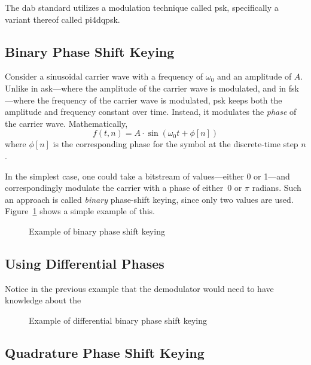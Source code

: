 \documentclass[class=report,11pt,crop=false]{standalone}
\begin{document}
The \gls{dab} standard utilizes a modulation technique called \acrlong{psk}, specifically a variant thereof called \gls{pi4dqpsk}.

\subsection{Binary Phase Shift Keying}
Consider a sinusoidal carrier wave with a frequency of \(\omega_0\) and an amplitude of \(A\). Unlike in \gls{ask}---where the amplitude of the carrier wave is modulated, and in \gls{fsk}---where the frequency of the carrier wave is modulated, \gls{psk} keeps both the amplitude and frequency constant over time. Instead, it modulates the \emph{phase} of the carrier wave. Mathematically,
\begin{equation}
    f(t, n) = A \cdot \sin(\omega_0t + \phi[n])
\end{equation}
where \(\phi[n]\) is the corresponding phase for the symbol at the discrete-time step \(n\).

In the simplest case, one could take a bitstream of values---either 0 or 1---and correspondingly modulate the carrier with a phase of either~\(0\) or \(\pi\) radians. Such an approach is called \emph{binary} phase-shift keying, since only two values are used. Figure~\ref{fig:binary-psk} shows a simple example of this.

\begin{figure}[htbp]
    \centering
    \def\svgwidth{1\linewidth}
    { %
        }
    \caption{Example of binary phase shift keying}
    \label{fig:binary-psk}
\end{figure}

\subsection{Using Differential Phases}
Notice in the previous example that the demodulator would need to have knowledge about the

\begin{figure}[htbp]
    \centering
    \def\svgwidth{1\linewidth}
    { %
        }
    \caption{Example of differential binary phase shift keying}
    \label{fig:differential-binary-psk}
\end{figure}

\subsection{Quadrature Phase Shift Keying}
\end{document}
